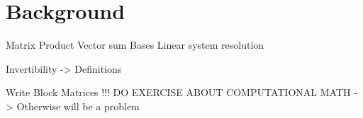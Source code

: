 \chapter{Background}

Matrix Product 
Vector sum
Bases
Linear system resolution

Invertibility -> Definitions

Write Block Matrices !!!
DO EXERCISE ABOUT COMPUTATIONAL MATH -> Otherwise will be a problem


